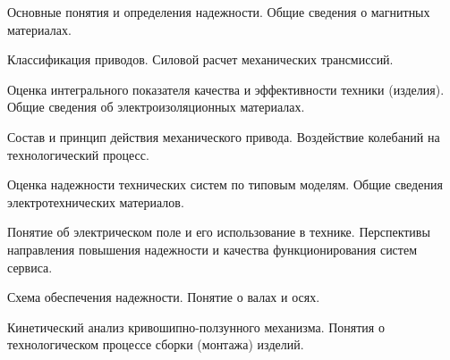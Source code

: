 \documentclass[
	14pt,
	a4paper,
	]
	{scrartcl}
\begin{document}
\vfill
\z Основные понятия и определения надежности.
 \vfill
\z Общие сведения о магнитных материалах.
 \vfill

\vfill

\newpage


\shapk
{}
\setcounter{zad}{0}

\vfill
\z Классификация приводов.
 \vfill
\z Силовой расчет механических трансмиссий.
 \vfill

\vfill

\newpage


\shapk
{}
\setcounter{zad}{0}

\vfill
\z Оценка интегрального показателя качества и эффективности техники (изделия).
 \vfill
\z Общие сведения об электроизоляционных материалах.
 \vfill

\vfill

\newpage


\shapk
{}
\setcounter{zad}{0}

\vfill
\z Состав и принцип действия механического привода.
 \vfill
\z Воздействие колебаний на технологический процесс.
 \vfill

\vfill

\newpage


\shapk
{}
\setcounter{zad}{0}

\vfill
\z Оценка надежности технических систем по типовым моделям.
 \vfill
\z Общие сведения электротехнических материалов.
 \vfill

\vfill

\newpage


\shapk
{}
\setcounter{zad}{0}

\vfill
\z Понятие об электрическом поле и его использование в технике.
 \vfill
\z Перспективы направления повышения надежности и качества функционирования систем сервиса.
 \vfill

\vfill

\newpage


\shapk
{}
\setcounter{zad}{0}

\vfill
\z Схема обеспечения надежности.
 \vfill
\z Понятие о валах и осях.
 \vfill

\vfill

\newpage


\shapk
{}
\setcounter{zad}{0}

\vfill
\z Кинетический анализ кривошипно-ползунного механизма.
 \vfill
\z Понятия о технологическом процессе сборки (монтажа) изделий.
 \vfill
\end{document}
